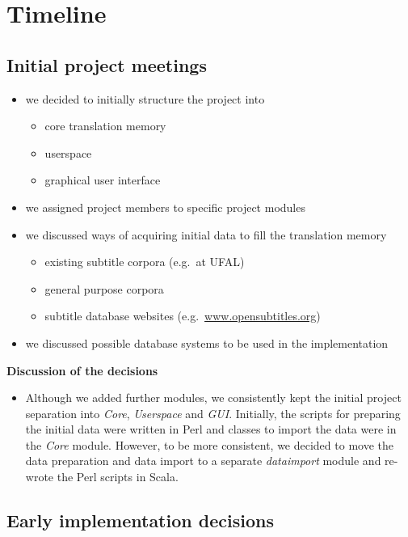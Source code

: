 \section{Timeline}

\subsection{Initial project meetings}

\begin{itemize}
	\item we decided to initially structure the project into
		\begin{itemize}
			\item core translation memory
			\item userspace
			\item graphical user interface
		\end{itemize}
	\item we assigned project members to specific project modules
	\item we discussed ways of acquiring initial data to fill the translation memory
		\begin{itemize}
			\item existing subtitle corpora (e.g.\ at UFAL)
			\item general purpose corpora
			\item subtitle database websites (e.g.\ \url{www.opensubtitles.org})
		\end{itemize}
	\item we discussed possible database systems to be used in the implementation
\end{itemize}


\noindent\textbf{Discussion of the decisions}
\begin{itemize}
	\item Although we added further modules, we consistently kept the initial project separation into \emph{Core}, \emph{Userspace} and \emph{GUI}. Initially, the scripts for preparing the initial data were written in Perl and classes to import the data were in the \emph{Core} module. However, to be more consistent, we decided to move the data preparation and data import to a separate \emph{dataimport} module and re-wrote the Perl scripts in Scala.
\end{itemize}

\subsection{Early implementation decisions}


